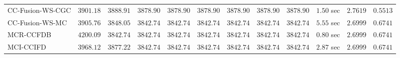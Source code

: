 \begin{table}[H]
\begin{tabular}{lrrrrrrrrrrr}
    CC-Fusion-WS-CGC & $      3901.18$ & $      3888.91$ & $      3878.90$ & $      3878.90$ & $      3878.90$ & $      3878.90$ & $      3878.90$ & $      3878.90$ & $         1.50$ sec    & $       2.7619$  & $       0.5513$ \\ 
     CC-Fusion-WS-MC & $      3905.76$ & $      3848.05$ & $      3842.74$ & $      3842.74$ & $      3842.74$ & $      3842.74$ & $      3842.74$ & $      3842.74$ & $         5.55$ sec    & $       2.6999$  & $       0.6741$ \\ 
\cmidrule{1-1} 
           MCR-CCFDB & $      4200.09$ & $      3842.74$ & $      3842.74$ & $      3842.74$ & $      3842.74$ & $      3842.74$ & $      3842.74$ & $      3842.74$ & $         0.80$ sec    & $       2.6999$  & $       0.6741$ \\ 
\cmidrule{1-1} 
           MCI-CCIFD & $      3968.12$ & $      3877.22$ & $      3842.74$ & $      3842.74$ & $      3842.74$ & $      3842.74$ & $      3842.74$ & $      3842.74$ & $         2.87$ sec    & $       2.6999$  & $       0.6741$ \\ 
\bottomrule
\end{tabular}
\end{table}

